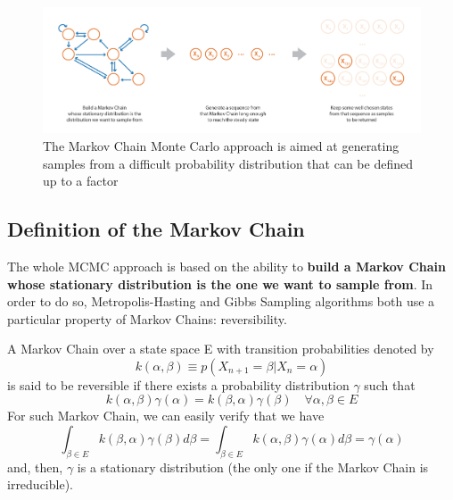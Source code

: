 \begin{figure}[h]
    \centering
\includegraphics[width=\textwidth]{pic/p05c08-snip04.png}
    \caption[The Markov Chain Monte Carlo approach is aimed at generating samples]{The Markov Chain Monte Carlo approach is aimed at generating samples from a difficult probability distribution that can be defined up to a factor}
    \label{fig:p05c08-snip04}
\end{figure}


\subsection{Definition of the Markov Chain}

The whole MCMC approach is based on the ability to \textbf{build a Markov Chain whose stationary distribution is the one we want to sample from}. In order to do so, Metropolis-Hasting and Gibbs Sampling algorithms both use a particular property of Markov Chains: reversibility.

A Markov Chain over a state space E with transition probabilities denoted by
\begin{equation}k(\alpha, \beta) \equiv p\left(X_{n+1}=\beta | X_{n}=\alpha\right)\end{equation}
is said to be reversible if there exists a probability distribution $\gamma$ such that
\begin{equation}k(\alpha, \beta) \gamma(\alpha)=k(\beta, \alpha) \gamma(\beta) \quad \forall \alpha, \beta \in E\end{equation}
For such Markov Chain, we can easily verify that we have
\begin{equation}\int_{\beta \in E} k(\beta, \alpha) \gamma(\beta) d \beta=\int_{\beta \in E} k(\alpha, \beta) \gamma(\alpha) d \beta=\gamma(\alpha)\end{equation}
and, then, $\gamma$ is a stationary distribution (the only one if the Markov Chain is irreducible).

